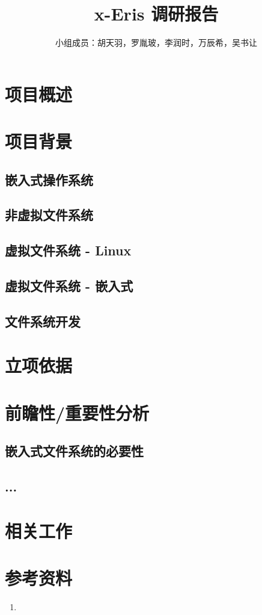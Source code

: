 \documentclass[a4paper]{article}
\title{x-Eris 调研报告}
\author{小组成员：胡天羽，罗胤玻，李润时，万辰希，吴书让}
\begin{document}
\maketitle

\section{项目概述}
\section{项目背景}
\subsection{嵌入式操作系统}
\subsection{非虚拟文件系统}
\subsection{虚拟文件系统 - Linux}
\subsection{虚拟文件系统 - 嵌入式}
\subsection{文件系统开发}
\section{立项依据}



\section{前瞻性/重要性分析}
\subsection{嵌入式文件系统的必要性}
\subsection{...}
\section{相关工作}


\section{参考资料}
\begin{enumerate}
    \item 
    
\end{enumerate}
\end{document}
